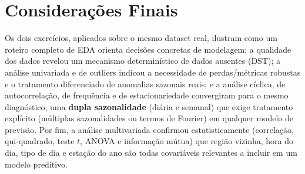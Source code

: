 \documentclass[12pt,a4paper]{article}
\begin{document}
\newpage
\section{Considerações Finais}

Os dois exercícios, aplicados sobre o mesmo dataset real, ilustram como um roteiro completo de EDA orienta decisões concretas de modelagem: a qualidade dos dados revelou um mecanismo determinístico de dados ausentes (DST); a análise univariada e de outliers indicou a necessidade de perdas/métricas robustas e o tratamento diferenciado de anomalias sazonais reais; e a análise cíclica, de autocorrelação, de frequência e de estacionariedade convergiram para o mesmo diagnóstico, uma \textbf{dupla sazonalidade} (diária e semanal) que exige tratamento explícito (múltiplas sazonalidades ou termos de Fourier) em qualquer modelo de previsão. Por fim, a análise multivariada confirmou estatisticamente (correlação, qui-quadrado, teste $t$, ANOVA e informação mútua) que região vizinha, hora do dia, tipo de dia e estação do ano são todas covariáveis relevantes a incluir em um modelo preditivo.
\end{document}
